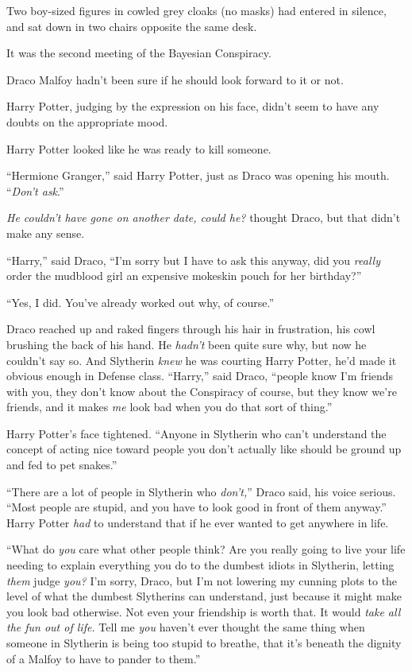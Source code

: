 Two boy-sized figures in cowled grey cloaks (no masks) had entered in silence, and sat down in two chairs opposite the same desk.

It was the second meeting of the Bayesian Conspiracy.

Draco Malfoy hadn't been sure if he should look forward to it or not.

Harry Potter, judging by the expression on his face, didn't seem to have any doubts on the appropriate mood.

Harry Potter looked like he was ready to kill someone.

``Hermione Granger,'' said Harry Potter, just as Draco was opening his mouth. ``\emph{Don't ask}.''

\emph{He couldn't have gone on another date, could he?} thought Draco, but that didn't make any sense.

``Harry,'' said Draco, ``I'm sorry but I have to ask this anyway, did you \emph{really} order the mudblood girl an expensive mokeskin pouch for her birthday?''

``Yes, I did. You've already worked out why, of course.''

Draco reached up and raked fingers through his hair in frustration, his cowl brushing the back of his hand. He \emph{hadn't} been quite sure why, but now he couldn't say so. And Slytherin \emph{knew} he was courting Harry Potter, he'd made it obvious enough in Defense class. ``Harry,'' said Draco, ``people know I'm friends with you, they don't know about the Conspiracy of course, but they know we're friends, and it makes \emph{me} look bad when you do that sort of thing.''

Harry Potter's face tightened. ``Anyone in Slytherin who can't understand the concept of acting nice toward people you don't actually like should be ground up and fed to pet snakes.''

``There are a lot of people in Slytherin who \emph{don't,}'' Draco said, his voice serious. ``Most people are stupid, and you have to look good in front of them anyway.'' Harry Potter \emph{had} to understand that if he ever wanted to get anywhere in life.

``What do \emph{you} care what other people think? Are you really going to live your life needing to explain everything you do to the dumbest idiots in Slytherin, letting \emph{them} judge \emph{you?} I'm sorry, Draco, but I'm not lowering my cunning plots to the level of what the dumbest Slytherins can understand, just because it might make you look bad otherwise. Not even your friendship is worth that. It would \emph{take all the fun out of life.} Tell me \emph{you} haven't ever thought the same thing when someone in Slytherin is being too stupid to breathe, that it's beneath the dignity of a Malfoy to have to pander to them.''

